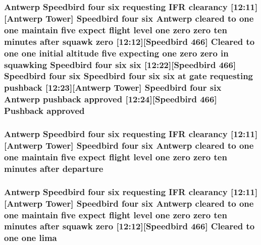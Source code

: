 \subsubsection[{\texorpdfstring{approved}{approved}}]{\setlength{\rightskip}{0pt plus 5cm}Antwerp Speedbird four {\bf six} requesting I\+FR clearancy \mbox{[}12\+:11\mbox{]}\mbox{[}Antwerp {\bf Tower}\mbox{]} Speedbird four {\bf six} Antwerp cleared to {\bf one} {\bf one} maintain five expect flight level {\bf one} {\bf zero} {\bf zero} {\bf ten} minutes after squawk {\bf zero} \mbox{[}12\+:12\mbox{]}\mbox{[}Speedbird 466\mbox{]} Cleared to {\bf one} {\bf one} initial altitude five expecting {\bf one} {\bf zero} {\bf zero} in {\bf squawking} Speedbird four {\bf six} {\bf six} \mbox{[}12\+:22\mbox{]}\mbox{[}Speedbird 466\mbox{]} Speedbird four {\bf six} Speedbird four {\bf six} {\bf six} at gate requesting pushback \mbox{[}12\+:23\mbox{]}\mbox{[}Antwerp {\bf Tower}\mbox{]} Speedbird four {\bf six} Antwerp pushback approved \mbox{[}12\+:24\mbox{]}\mbox{[}Speedbird 466\mbox{]} Pushback approved}\hypertarget{happyDay5ATC_8txt_ac858d170c8c9788ee90f1502f4299d18}{}\label{happyDay5ATC_8txt_ac858d170c8c9788ee90f1502f4299d18}
\subsubsection[{\texorpdfstring{departure}{departure}}]{\setlength{\rightskip}{0pt plus 5cm}Antwerp Speedbird four {\bf six} requesting I\+FR clearancy \mbox{[}12\+:11\mbox{]}\mbox{[}Antwerp {\bf Tower}\mbox{]} Speedbird four {\bf six} Antwerp cleared to {\bf one} {\bf one} maintain five expect flight level {\bf one} {\bf zero} {\bf zero} {\bf ten} minutes after departure}\hypertarget{happyDay5ATC_8txt_af9835824e50bb6ca59bed75129f137e3}{}\label{happyDay5ATC_8txt_af9835824e50bb6ca59bed75129f137e3}
\subsubsection[{\texorpdfstring{lima}{lima}}]{\setlength{\rightskip}{0pt plus 5cm}Antwerp Speedbird four {\bf six} requesting I\+FR clearancy \mbox{[}12\+:11\mbox{]}\mbox{[}Antwerp {\bf Tower}\mbox{]} Speedbird four {\bf six} Antwerp cleared to {\bf one} {\bf one} maintain five expect flight level {\bf one} {\bf zero} {\bf zero} {\bf ten} minutes after squawk {\bf zero} \mbox{[}12\+:12\mbox{]}\mbox{[}Speedbird 466\mbox{]} Cleared to {\bf one} {\bf one} lima}\hypertarget{happyDay5ATC_8txt_abc10fad7597c191bcd8586b1cddb7835}{}\label{happyDay5ATC_8txt_abc10fad7597c191bcd8586b1cddb7835}
